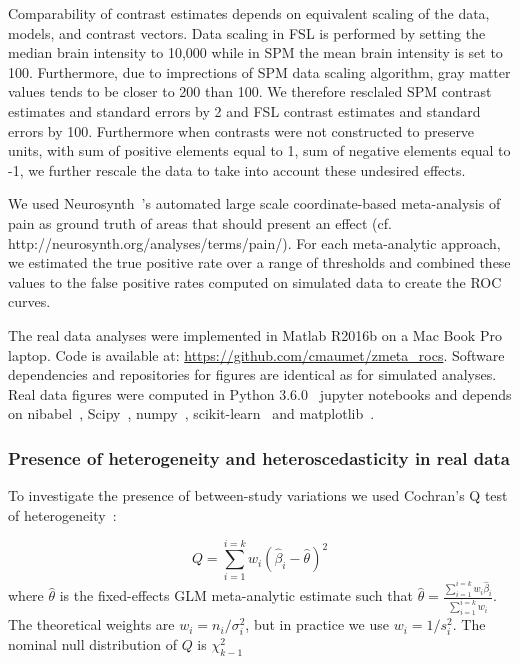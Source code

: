 \documentclass[preprint]{elsarticle}
\newcommand{\nStudies}{k}
\begin{document}

Comparability of contrast estimates depends on equivalent scaling of the data, models, and contrast vectors. Data scaling in FSL is performed by setting the median brain intensity to 10,000 while in SPM the mean brain intensity is set to 100. Furthermore, due to imprections of SPM data scaling algorithm, gray matter values tends to be closer to 200 than 100. We therefore resclaled SPM contrast estimates and standard errors by 2 and FSL contrast estimates and standard errors by 100. Furthermore when contrasts were not constructed to preserve units, with sum of positive elements equal to 1, sum of negative elements equal to -1, we further rescale the data to take into account these undesired effects.

We used Neurosynth~\cite{Yarkoni2011}'s automated large scale coordinate-based meta-analysis of pain as ground truth of areas that should present an effect (cf. http://neurosynth.org/analyses/terms/pain/). For each meta-analytic approach, we estimated the true positive rate over a range of thresholds and combined these values to the false positive rates computed on simulated data to create the ROC curves. 

The real data analyses were implemented in Matlab R2016b on a Mac Book Pro laptop. Code is available at: \url{https://github.com/cmaumet/zmeta_rocs}. Software dependencies and repositories for figures are identical as for simulated analyses. Real data figures were computed in Python 3.6.0~\cite{van1995python} jupyter notebooks and depends on nibabel~\cite{Brett2016}, Scipy~\cite{Scipy2001}, numpy~\cite{walt2011numpy}, scikit-learn~\cite{pedregosa2011scikit} and matplotlib~\cite{hunter2007matplotlib}.


\subsubsection{Presence of heterogeneity and heteroscedasticity in real data}

To investigate the presence of between-study variations we used Cochran's Q test of heterogeneity~\cite{higgins2002quantifying}:

\begin{equation}
	Q = \sum_{i=1}^{i=k} w_i (\hat \beta_i - \hat \theta)^2
\end{equation}
where $\hat \theta$ is the fixed-effects GLM meta-analytic estimate such that $\hat \theta = \frac{\sum_{i=1}^{i=k}  w_i \hat \beta_i}{\sum_{i=1}^{i=k}  w_i}$. The theoretical weights are $w_i = n_i/\sigma^2_i$, but in practice we use $w_i = 1/s_i^2$. The nominal null distribution of $Q$ is $\chi^2_{\nStudies-1}$
\end{document}
